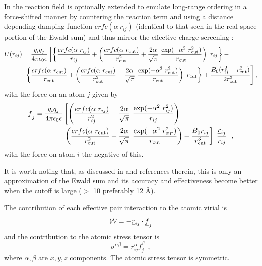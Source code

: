 In \D the reaction field is optionally extended to emulate
long-range ordering in a force-shifted manner by countering
the reaction term and using a distance depending damping
function $erfc(\alpha~r_{ij})$ (identical to that seen in
the real-space portion of the Ewald sum) and thus mirror the
effective charge screening \cite{fennell-06}:
\begin{eqnarray}
U(r_{ij}) = {q_{i} q_{j} \over 4\pi\epsilon_{0}\epsilon} \left[
\left\{ \frac{erfc(\alpha~r_{ij})}{r_{ij}} + \left(\frac{erfc(\alpha~r_{\rm cut})}{r_{\rm cut}^{2}}+
\frac{2\alpha}{\sqrt{\pi}}~\frac{\exp(-\alpha^{2}~r_{\rm cut}^{2})}{r_{\rm cut}}\right)~r_{ij}\right\} - \phantom{xxxxxxx} \right. \nonumber \\
\left. \left\{ \frac{erfc(\alpha~r_{\rm cut})}{r_{\rm cut}} + \left(\frac{erfc(\alpha~r_{\rm cut})}{r_{\rm cut}^{2}}+
\frac{2\alpha}{\sqrt{\pi}}~\frac{\exp(-\alpha^{2}~r_{\rm cut}^{2})}{r_{\rm cut}}\right)~r_{\rm cut}\right\} +
\frac{B_{0}(r_{ij}^{2}-r_{\rm cut}^{2})}{2 r_{\rm cut}^{3}} \right],
\end{eqnarray}
with the force on an atom $j$ given by
\begin{eqnarray}
\mbox{$\underline{f}$}_{j} = {q_{i} q_{j} \over 4\pi\epsilon_{0}\epsilon} \left[ \left( \frac{erfc(\alpha~r_{ij})}{r_{ij}^{2}} +
\frac{2\alpha}{\sqrt{\pi}}~\frac{\exp(-\alpha^{2}~r_{ij}^{2})}{r_{ij}} \right) - \phantom{xxxxxxxxxxx} \right. \nonumber \\
\left. \left( \frac{erfc(\alpha~r_{\rm cut})}{r_{\rm cut}^{2}} +
\frac{2\alpha}{\sqrt{\pi}}~\frac{\exp(-\alpha^{2}~r_{\rm cut}^{2})}{r_{\rm cut}} \right) -
\frac{B_{0}r_{ij}}{r_{\rm cut}^{3}} \right]~\frac{\mbox{$\underline{r}$}_{ij}}{r_{ij}}~~,
\end{eqnarray}
with the force on atom $i$ the negative of this.

It is worth noting that, as discussed in \cite{fennell-06} and
references therein, this is only an approximation of the Ewald
sum and its accuracy and effectiveness become better when the
cutoff is large ($>$ 10 preferably 12 \AA).

The contribution of each effective pair interaction to the atomic
virial is
\begin{equation}
{\cal W} = -\mbox{$\underline{r}$}_{ij} \cdot \mbox{$\underline{f}$}_{j}
\end{equation}
and the contribution to the atomic stress tensor is
\begin{equation}
\sigma^{\alpha \beta} = r_{ij}^{\alpha} f_{j}^{\beta}~~,
\end{equation}
where $\alpha,\beta$ are $x,y,z$ components.  The atomic stress
tensor is symmetric.

